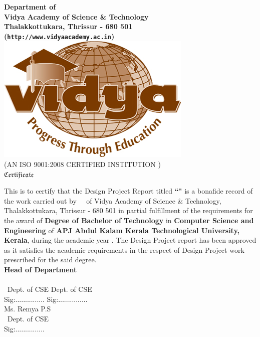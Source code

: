 



\begin{titlepage}


\begin{center}


{\Large \bf Department of \vdept  }\\
{\Large \bf Vidya Academy of Science \& Technology}\\
{\normalsize \bf Thalakkottukara, Thrissur - 680 501\\
({\tt http://www.vidyaacademy.ac.in})}\\[0.75cm]
%
%
\includegraphics[width=3.5 cm]{VidyaLogo.JPG}\\
\scriptsize (AN ISO 9001:2008 CERTIFIED INSTITUTION )\\[1 cm]
%
 \Huge  $ \mathfrak{Certificate}$\\[0.5cm]
%
\end{center}

\quad This is to certify that the Design Project Report titled {\bf ``\vtitle"} is a bonafide record of the work carried out by {\bf \vauthora\, \vauthorb\, \vauthorc } of Vidya Academy of Science \& Technology, Thalakkottukara, Thrissur - 680 501 in partial fulfillment of the requirements for the award of  {\bf Degree of Bachelor of Technology} in {\bf Computer Science and Engineering} of  {\bf APJ Abdul Kalam Kerala Technological University, Kerala}, during the academic year \vacademicyear. The Design Project report has been approved as it satisfies the academic requirements in the respect of Design Project work prescribed for the said degree.\\[1 cm]
 
 \hfill  {\bf Head of Department} \\[.3cm]
\noindent \vguide \hfill \vhod \\ \vguidedg\ Dept. of CSE \hfill Dept. of CSE \\
Sig:...............  \hfill  Sig:............... \\[.25 cm]
\noindent Ms. Remya P.S\\
\vguidedg\, Dept. of CSE \\
Sig:............... 




%
\end{titlepage}

%  